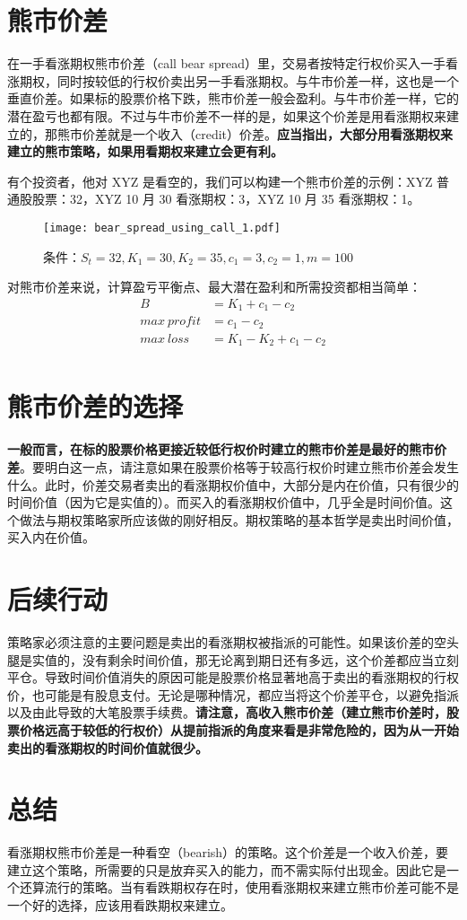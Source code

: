 \documentclass{article}
\begin{document}
\section{熊市价差}
在一手看涨期权熊市价差（call bear spread）里，交易者按特定行权价买入一手看涨期权，同时按较低的行权价卖出另一手看涨期权。与牛市价差一样，这也是一个垂直价差。如果标的股票价格下跌，熊市价差一般会盈利。与牛市价差一样，它的潜在盈亏也都有限。不过与牛市价差不一样的是，如果这个价差是用看涨期权来建立的，那熊市价差就是一个收入（credit）价差。\textbf{应当指出，大部分用看涨期权来建立的熊市策略，如果用看期权来建立会更有利。}

有个投资者，他对 XYZ 是看空的，我们可以构建一个熊市价差的示例：XYZ 普通股股票：32，XYZ 10 月 30 看涨期权：3，XYZ 10 月 35 看涨期权：1。

\begin{figure}[h]
    \centering
    \texttt{[image: bear\_spread\_using\_call\_1.pdf]}
    \caption{条件：$S_t=32, K_1=30, K_2=35, c_1=3, c_2=1, m=100$}
    \label{fig:bear_spread_using_call_1}
\end{figure}

对熊市价差来说，计算盈亏平衡点、最大潜在盈利和所需投资都相当简单：
\begin{equation}
    \begin{aligned}
        B&=K_1+c_1-c_2\\
        max~profit&=c_1-c_2\\
        max~loss&=K_1-K_2+c_1-c_2\\
    \end{aligned}
\end{equation}
\section{熊市价差的选择}
\textbf{一般而言，在标的股票价格更接近较低行权价时建立的熊市价差是最好的熊市价差}。要明白这一点，请注意如果在股票价格等于较高行权价时建立熊市价差会发生什么。此时，价差交易者卖出的看涨期权价值中，大部分是内在价值，只有很少的时间价值（因为它是实值的）。而买入的看涨期权价值中，几乎全是时间价值。这个做法与期权策略家所应该做的刚好相反。期权策略的基本哲学是卖出时间价值，买入内在价值。
\section{后续行动}
策略家必须注意的主要问题是卖出的看涨期权被指派的可能性。如果该价差的空头腿是实值的，没有剩余时间价值，那无论离到期日还有多远，这个价差都应当立刻平仓。导致时间价值消失的原因可能是股票价格显著地高于卖出的看涨期权的行权价，也可能是有股息支付。无论是哪种情况，都应当将这个价差平仓，以避免指派以及由此导致的大笔股票手续费。\textbf{请注意，高收入熊市价差（建立熊市价差时，股票价格远高于较低的行权价）从提前指派的角度来看是非常危险的，因为从一开始卖出的看涨期权的时间价值就很少。}
\section{总结}
看涨期权熊市价差是一种看空（bearish）的策略。这个价差是一个收入价差，要建立这个策略，所需要的只是放弃买入的能力，而不需实际付出现金。因此它是一个还算流行的策略。当有看跌期权存在时，使用看涨期权来建立熊市价差可能不是一个好的选择，应该用看跌期权来建立。
\end{document}
